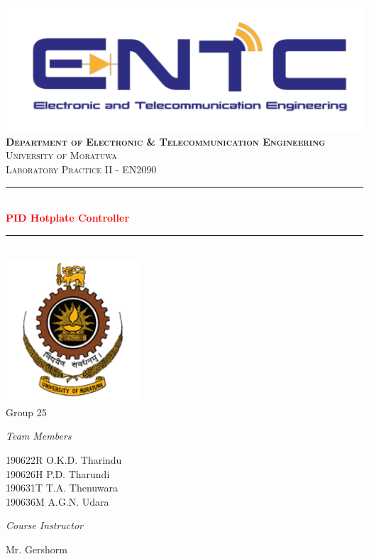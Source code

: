 \newcommand{\HRule}{\rule{\linewidth}{0.5mm}} 

\begin{titlepage}
\center
\includegraphics[width=0.7\linewidth]{ENTC.png}\\[1cm]
\textsc{
\Huge \textbf{Department of Electronic \& Telecommunication Engineering}\\[.5cm]
\Large
University of Moratuwa\\[0.5cm] 
Laboratory Practice II - EN2090}\\[0.5cm]

\sffamily
\HRule \\[0.4cm]
\textbf{\Huge\textcolor{red}{PID Hotplate Controller}}\\[0.2cm] 
\HRule \\[1cm]
\includegraphics[width=5cm]{Picture1.png}\\[1cm]
 \Large
Group 25\\[5mm]
\large
\begin{minipage}[t]{.5\textwidth}
\begin{flushleft}
\emph{ \Large Team Members}

\large 190622R \quad O.K.D. Tharindu\\
\large 190626H \quad P.D. Tharundi \\
\large 190631T \quad T.A. Thenuwara\\
\large 190636M \quad A.G.N. Udara\\
\end{flushleft}

\end{minipage}\hfill\begin{minipage}[t]{.4\textwidth}

\begin{flushright}
\emph{ \Large Course Instructor} 

Mr. Gershorm\\ 

\end{flushright}
\end{minipage}
\end{titlepage}

